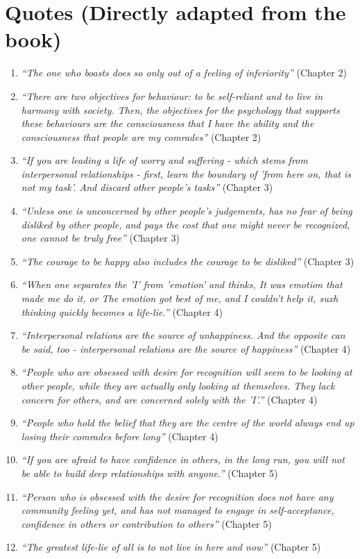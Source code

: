 \section*{Quotes (Directly adapted from the book)}
\begin{enumerate}
    \item \emph{``The one who boasts does so only out of a feeling of inferiority''} (Chapter 2)
    \item \emph{``There are two objectives for behaviour: to be self-reliant and to live in harmony with society. Then, the objectives for the psychology that supports these behaviours are the consciousness that I have the ability and the consciousness that people are my comrades''} (Chapter 2)
    \item \emph{``If you are leading a life of worry and suffering - which stems from interpersonal relationships - first, learn the boundary of 'from here on, that is not my task'. And discard other people's tasks''} (Chapter 3)
    \item \emph{``Unless one is unconcerned by other people's judgements, has no fear of being disliked by other people, and pays the cost that one might never be recognized, one cannot be truly free''} (Chapter 3)
    \item \emph{``The courage to be happy also includes the courage to be disliked''} (Chapter 3)
    \item \emph{``When one separates the 'I' from 'emotion' and thinks, It was emotion that made me do it, or The emotion got best of me, and I couldn't help it, suxh thinking quickly becomes a life-lie.''} (Chapter 4)
    \item \emph{``Interpersonal relations are the source of unhappiness. And the opposite can be said, too - interpersonal relations are the source of happiness''} (Chapter 4)
    \item \emph{``People who are obsessed with desire for recognition will seem to be looking at other people, while they are actually only looking at themselves. They lack concern for others, and are concerned solely with the 'I'.''} (Chapter 4)
    \item \emph{``People who hold the belief that they are the centre of the world always end up losing their comrades before long''} (Chapter 4)
    \item \emph{``If you are afraid to have confidence in others, in the long run, you will not be able to build deep relationships with anyone.''} (Chapter 5)
    \item \emph{``Person who is obsessed with the desire for recognition does not have any community feeling yet, and has not managed to engage in self-acceptance, confidence in others or contribution to others''} (Chapter 5)
    \item \emph{``The greatest life-lie of all is to not live in here and now''} (Chapter 5)
\end{enumerate}